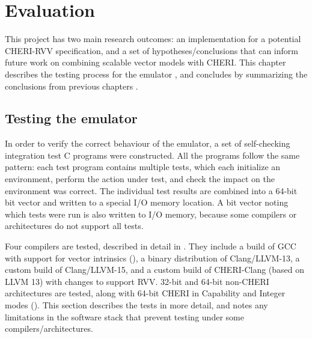 \documentclass[../thesis]{subfiles}
\begin{document}
\chapter{Evaluation\label{chap:eval}}
This project has two main research outcomes: an implementation for a potential CHERI-RVV specification, and a set of hypotheses/conclusions that can inform future work on combining scalable vector models with CHERI.
This chapter describes the testing process for the emulator \todoref{}, and concludes by summarizing the conclusions from previous chapters \todoref{}.

\section{Testing the emulator}
In order to verify the correct behaviour of the emulator, a set of self-checking integration test C programs were constructed.
All the programs follow the same pattern: each test program contains multiple tests, which each initialize an environment, perform the action under test, and check the impact on the environment was correct.
The individual test results are combined into a 64-bit bit vector and written to a special I/O memory location.
A bit vector noting which tests were run is also written to I/O memory, because some compilers or architectures do not support all tests.

Four compilers are tested, described in detail in .
They include a build of GCC with support for vector intrinsics (), a binary distribution of Clang/LLVM-13, a custom build of Clang/LLVM-15, and a custom build of CHERI-Clang (based on LLVM 13) with changes to support RVV.
32-bit and 64-bit non-CHERI architectures are tested, along with 64-bit CHERI in Capability and Integer modes ().
This section describes the tests in more detail, and notes any limitations in the software stack that prevent testing under some compilers/architectures.

\end{document}
